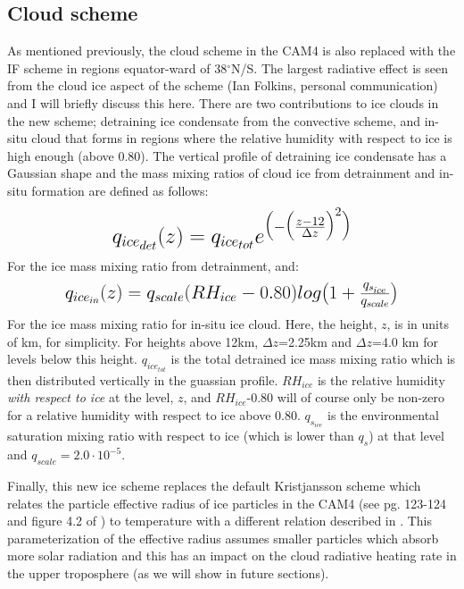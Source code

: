 \documentclass[letterpaper,12pt,titlepage,oneside,final]{book}
\begin{document}
\subsection{Cloud scheme}
As mentioned previously, the cloud scheme in the CAM4 is also replaced with the IF scheme in regions equator-ward of 38$^{\circ}$N/S. The largest radiative effect is seen from the cloud ice aspect of the scheme (Ian Folkins, personal communication) and I will briefly discuss this here. There are two contributions to ice clouds in the new scheme; detraining ice condensate from the convective scheme, and in-situ cloud that forms in regions where the relative humidity with respect to ice is high enough (above 0.80). The vertical profile of detraining ice condensate has a Gaussian shape and the mass mixing ratios of cloud ice from detrainment and in-situ formation are defined as follows:
\begin{align}
\mbox{\fontsize{17.28}{21.6}\selectfont\(
q_{ice_{det}}(z)=q_{ice_{tot}}e^{\big(-\big(\frac{z-12}{\Delta{z}}\big)^{2}\big)}
\)}
\end{align}
For the ice mass mixing ratio from detrainment, and:
\begin{align}
\mbox{\fontsize{15}{21.6}\selectfont\(
q_{ice_{in}}(z)=q_{scale}(RH_{ice}-0.80)log\big(1+\frac{q_{s_{ice}}}{q_{scale}}\big)
\)}
\end{align}
For the ice mass mixing ratio for in-situ ice cloud. Here, the  height, $z$, is in units of km, for simplicity. For heights above 12km, $\Delta{z}$=2.25km and $\Delta{z}$=4.0 km for levels below this height. $q_{ice_{tot}}$ is the total detrained ice mass mixing ratio which is then distributed vertically in the guassian profile. $RH_{ice}$ is the relative humidity \textit{with respect to ice} at the level, $z$, and $RH_{ice}$-0.80 will of course only be non-zero for a relative humidity with respect to ice above 0.80. $q_{s_{ice}}$ is the environmental saturation mixing ratio with respect to ice (which is lower than $q_{s}$) at that level and $q_{scale}=2.0\cdot10^{-5}$. 

Finally, this new ice scheme replaces the default Kristjansson scheme which relates the particle effective radius of ice particles \citep{kristjansson_impact_2000} in the CAM4 (see pg. 123-124 and figure 4.2 of \cite{neale_description_2010}) to temperature with a different relation described in \citep{garrett_small_2003}. This parameterization of the effective radius assumes smaller particles which absorb more solar radiation and this has an impact on the cloud radiative heating rate in the upper troposphere (as we will show in future sections). 
\end{document}
